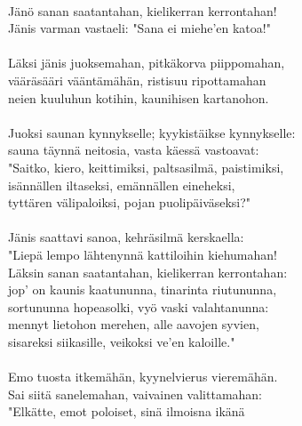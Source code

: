                                                                \\
Jänö sanan saatantahan, kielikerran kerrontahan!               \\
Jänis varman vastaeli: "Sana ei miehe'en katoa!"               \\
                                                               \\
Läksi jänis juoksemahan, pitkäkorva piippomahan,               \\
vääräsääri vääntämähän, ristisuu ripottamahan                  \\
neien kuuluhun kotihin, kaunihisen kartanohon.                 \\
                                                               \\
Juoksi saunan kynnykselle; kyykistäikse kynnykselle:           \\
sauna täynnä neitosia, vasta käessä vastoavat:                 \\
"Saitko, kiero, keittimiksi, paltsasilmä, paistimiksi,         \\
isännällen iltaseksi, emännällen eineheksi,                    \\
tyttären välipaloiksi, pojan puolipäiväseksi?"                 \\
                                                               \\
Jänis saattavi sanoa, kehräsilmä kerskaella:                   \\
"Liepä lempo lähtenynnä kattiloihin kiehumahan!                \\
Läksin sanan saatantahan, kielikerran kerrontahan:             \\
jop' on kaunis kaatununna, tinarinta riutununna,               \\
sortununna hopeasolki, vyö vaski valahtanunna:                 \\
mennyt lietohon merehen, alle aavojen syvien,                  \\
sisareksi siikasille, veikoksi ve'en kaloille."                \\
                                                               \\
Emo tuosta itkemähän, kyynelvierus vieremähän.                 \\
Sai siitä sanelemahan, vaivainen valittamahan:                 \\
"Elkätte, emot poloiset, sinä ilmoisna ikänä                   \\

